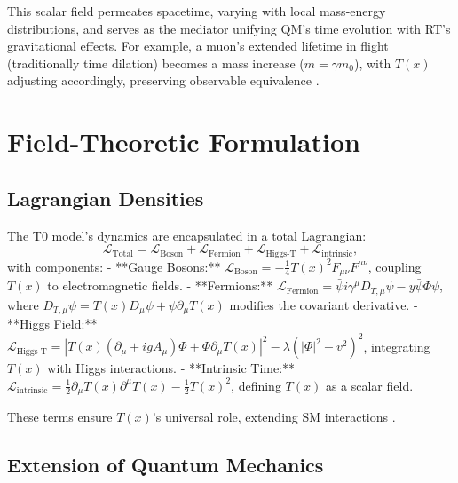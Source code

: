 \documentclass[twocolumn,aps,prl]{revtex4-2}
\newcommand{\Tfield}{T(x)}
\newcommand{\DhiggsT}{\Tfield (\partial_\mu + ig A_\mu) \Phi + \Phi \partial_\mu \Tfield}
\newcommand{\DTmu}{D_{T,\mu}}
\newcommand{\calL}{\mathcal{L}}
\begin{document}
	This scalar field permeates spacetime, varying with local mass-energy distributions, and serves as the mediator unifying QM’s time evolution with RT’s gravitational effects. For example, a muon’s extended lifetime in flight (traditionally time dilation) becomes a mass increase (\(m = \gamma m_0\)), with \(\Tfield\) adjusting accordingly, preserving observable equivalence \cite{pascher_quantum_2025}.
	
	\section{Field-Theoretic Formulation}
	\label{sec:field_theory}
	
	\subsection{Lagrangian Densities}
	\label{subsec:lagrangian}
	
	The T0 model’s dynamics are encapsulated in a total Lagrangian:
	\begin{equation}
		\calL_{\text{Total}} = \calL_{\text{Boson}} + \calL_{\text{Fermion}} + \calL_{\text{Higgs-T}} + \calL_{\text{intrinsic}},
		\label{eq:total_lagrangian}
	\end{equation}
	with components:
	- **Gauge Bosons:** \(\calL_{\text{Boson}} = -\frac{1}{4}\Tfield^2 F_{\mu\nu}F^{\mu\nu}\), coupling \(\Tfield\) to electromagnetic fields.
	- **Fermions:** \(\calL_{\text{Fermion}} = \bar{\psi}i\gamma^{\mu}\DTmu\psi - y\bar{\psi}\Phi\psi\), where \(\DTmu\psi = \Tfield D_{\mu}\psi + \psi\partial_{\mu}\Tfield\) modifies the covariant derivative.
	- **Higgs Field:** \(\calL_{\text{Higgs-T}} = |\DhiggsT|^2 - \lambda(|\Phi|^2 - v^2)^2\), integrating \(\Tfield\) with Higgs interactions.
	- **Intrinsic Time:** \(\calL_{\text{intrinsic}} = \frac{1}{2}\partial_{\mu}\Tfield\partial^{\mu}\Tfield - \frac{1}{2}\Tfield^2\), defining \(\Tfield\) as a scalar field.
	
	These terms ensure \(\Tfield\)’s universal role, extending SM interactions \cite{pascher_lagrange_2025}.
	
	\subsection{Extension of Quantum Mechanics}
	\label{subsec:qm_extension}
	
\end{document}
